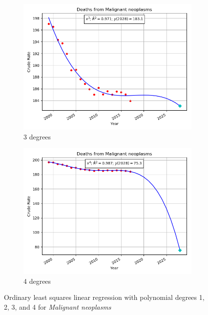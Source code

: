 \documentclass[12pt, a4paper, twocolumn]{article}
\begin{document}
\begin{figure}
  \begin{subfigure}[b]{0.4\textwidth}
    \includegraphics[width=\textwidth]{Malignant_neoplasms_3_model.png}
    \caption{3 degrees}
    \label{fig:deg3}
  \end{subfigure}

  \begin{subfigure}[b]{0.4\textwidth}
    \includegraphics[width=\textwidth]{Malignant_neoplasms_4_model.png}
    \caption{4 degrees}
    \label{fig:deg4}
  \end{subfigure}
  \caption{Ordinary least squares linear regression with polynomial degrees 1, 2, 3, and 4 for \textit{Malignant neoplasms}}\label{fig:neoplasmregs}
\end{figure}
\end{document}
